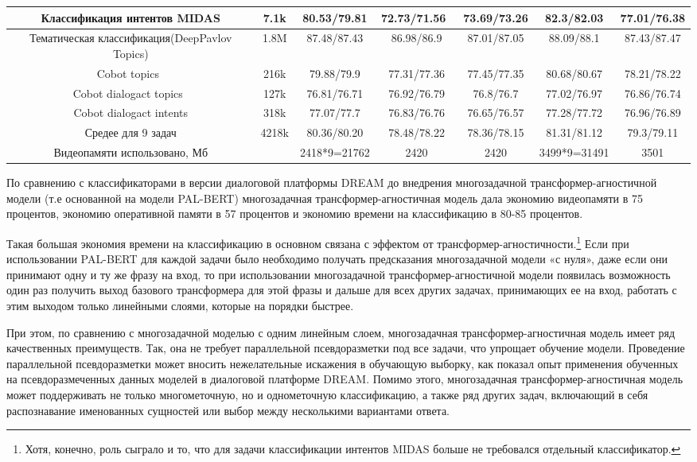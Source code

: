 \begin{table}[htbp]
{\begin{tabular}{|c||c|c|c|c|c|c|}
Классификация интентов MIDAS          & 7.1k & 80.53/79.81 & 72.73/71.56~ & 73.69/73.26 & 82.3/82.03  & 77.01/76.38 \\ \hline
Тематическая классификация(DeepPavlov Topics) & 1.8M & 87.48/87.43 & 86.98/86.9  & 87.01/87.05         & 88.09/88.1  & 87.43/87.47 \\ \hline
Cobot topics~                  & 216k & 79.88/79.9  & 77.31/77.36 & 77.45/77.35         & 80.68/80.67 & 78.21/78.22 \\ \hline
Cobot dialogact topics~             & 127k & 76.81/76.71 & 76.92/76.79 & 76.8/76.7          & 77.02/76.97 & 76.86/76.74 \\ \hline
Cobot dialogact intents             & 318k & 77.07/77.7  & 76.83/76.76 & 76.65/76.57         & 77.28/77.72 & 76.96/76.89 \\ \hline
Средее для 9 задач                   & 4218k & 80.36/80.20    & 78.48/78.22 & 78.36/78.15         & 81.31/81.12  & 79.3/79.11 \\ \hline
Видеопамяти использовано, Мб               &    & 2418*9=21762 & 2420     & 2420             & 3499*9=31491 & 3501    \\ \hline
\end{tabular}
}
\end{table}

По сравнению с классификаторами в версии диалоговой платформы DREAM до внедрения многозадачной трансформер-агностичной модели (т.е основанной на модели PAL-BERT) многозадачная трансформер-агностичная модель дала экономию видеопамяти в 75 процентов, экономию оперативной памяти в 57 процентов и экономию времени на классификацию в 80-85 процентов.
 
Такая большая экономия времени на классификацию в основном связана с эффектом от трансформер-агностичности.\footnote{Хотя, конечно, роль сыграло и то, что для задачи классификации интентов MIDAS больше не требовался отдельный классификатор.} Если при использовании PAL-BERT для каждой задачи было необходимо получать предсказания многозадачной модели «с нуля», даже если они принимают одну и ту же фразу на вход, то при использовании многозадачной трансформер-агностичной модели появилась возможность один раз получить выход базового трансформера для этой фразы и дальше для всех других задачах, принимающих ее на вход, работать с этим выходом только линейными слоями, которые на порядки быстрее.

При этом, по сравнению с многозадачной моделью с одним линейным слоем, многозадачная трансформер-агностичная модель имеет ряд качественных преимуществ. Так, она не требует параллельной псевдоразметки под все задачи, что упрощает обучение модели. Проведение параллельной псевдоразметки может вносить нежелательные искажения в обучающую выборку, как показал опыт применения обученных на псевдоразмеченных данных моделей в диалоговой платформе DREAM. Помимо этого, многозадачная трансформер-агностичная модель может поддерживать не только многометочную, но и однометочную классификацию, а также ряд других задач, включающий в себя распознавание именованных сущностей или выбор между несколькими вариантами ответа.

